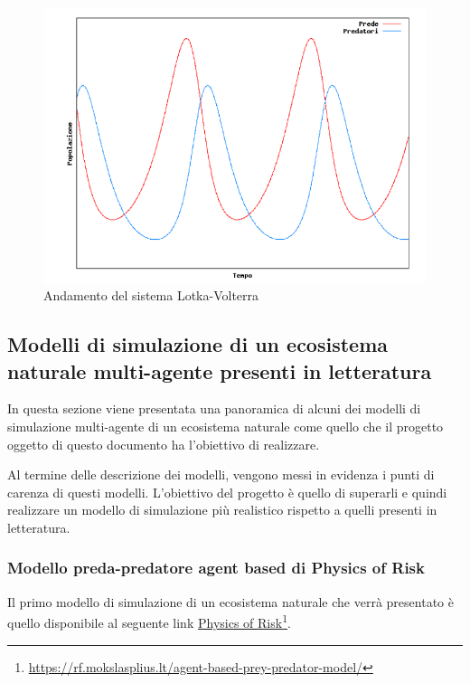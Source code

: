 \documentclass[11pt]{article}
\begin{document}
\begin{figure}[h]
    \centering
    \includegraphics[scale = 0.7]{risultatoLotkaVolterra.PNG}
    \caption{Andamento del sistema Lotka-Volterra}
    \label{fig:AndamentoLotkaVolterra}
\end{figure}


\subsection{Modelli di simulazione di un ecosistema naturale multi-agente presenti in letteratura}
In questa sezione viene presentata una panoramica di alcuni dei modelli di simulazione multi-agente di un ecosistema naturale come quello che il progetto oggetto di questo documento ha l'obiettivo di realizzare. 

Al termine delle descrizione dei modelli, vengono messi in evidenza i punti di carenza di questi modelli. L'obiettivo del progetto è quello di superarli e quindi realizzare un modello di simulazione più realistico rispetto a quelli presenti in letteratura.

\subsubsection{Modello preda-predatore agent based di Physics of Risk}
Il primo modello di simulazione di un ecosistema naturale che verrà presentato è quello disponibile al seguente link \href{https://rf.mokslasplius.lt/agent-based-prey-predator-model/}{Physics of Risk}\footnote{\url{https://rf.mokslasplius.lt/agent-based-prey-predator-model/}}.
\end{document}
